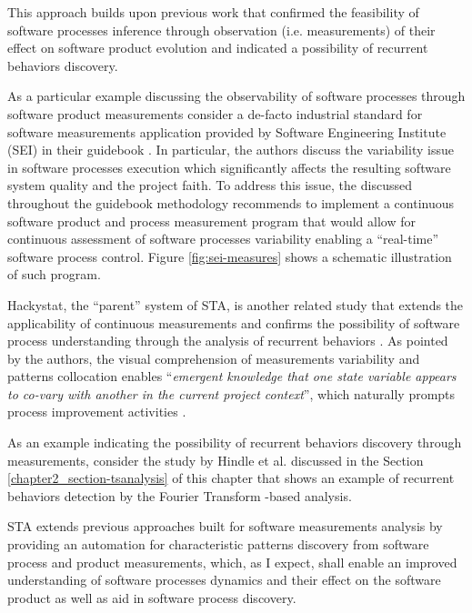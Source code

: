 This approach builds upon previous work that confirmed the feasibility of software processes inference through 
observation (i.e. measurements) of their effect on software product evolution and indicated a possibility of 
recurrent behaviors discovery. 

As a particular example discussing the observability of software processes through software product measurements 
consider a de-facto industrial standard for software measurements application provided by 
Software Engineering Institute (SEI) in their guidebook \cite{citeulike:10567306}. 
In particular, the authors discuss the variability issue in software processes execution which significantly 
affects the resulting software system quality and the project faith. 
To address this issue, the discussed throughout the guidebook methodology recommends to implement a continuous 
software product and process measurement program that would allow for continuous assessment of software processes 
variability enabling a ``real-time'' software process control. Figure \ref{fig:sei-measures} shows a schematic 
illustration of such program.

Hackystat, the ``parent'' system of STA, is another related study that extends the applicability of continuous 
measurements and confirms the possibility of software process understanding through the analysis of recurrent 
behaviors \cite{citeulike:557296}. 
As pointed by the authors, the visual comprehension of measurements variability and patterns collocation enables 
``\textit{emergent knowledge that one state variable appears to co-vary with another in the current project context}'',
which naturally prompts process improvement activities \cite{citeulike:557296}. 

As an example indicating the possibility of recurrent behaviors discovery through measurements, consider the 
study by Hindle et al. \cite{citeulike:10377345} discussed in the Section \ref{chapter2_section-tsanalysis} of 
this chapter that shows an example of recurrent behaviors detection by the Fourier Transform -based analysis.

STA extends previous approaches built for software measurements analysis by providing an automation for 
characteristic patterns discovery from software process and product measurements, which, as I expect, shall 
enable an improved understanding of software processes dynamics and their effect on the software product as
well as aid in software process discovery.


